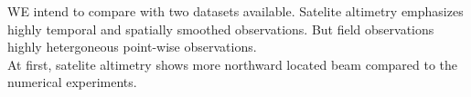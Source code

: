 \documentclass[12pt]{article}
\begin{document}
WE intend to compare with two datasets available. Satelite altimetry emphasizes highly temporal and 
spatially smoothed observations. But field observations highly hetergoneous point-wise 
observations.\\
At first, satelite altimetry shows more northward located beam compared to the numerical 
experiments. 
%
%
%
\end{document}

